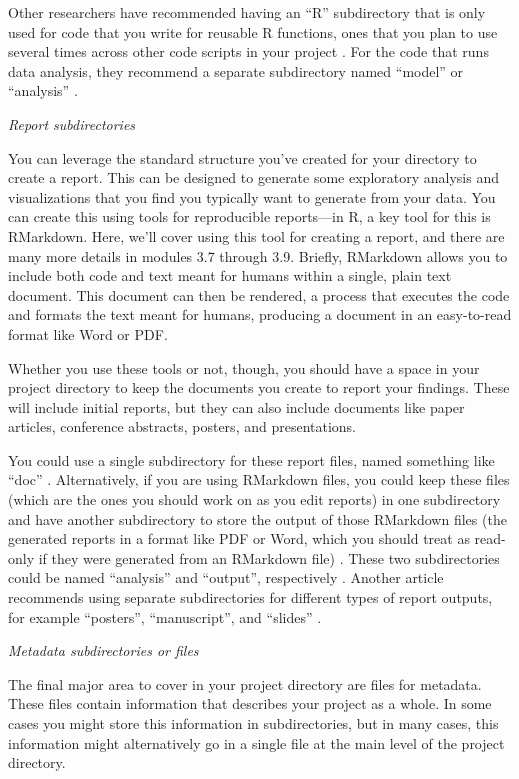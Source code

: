 \documentclass[]{tufte-book}
\begin{document}
Other researchers have recommended having an ``R'' subdirectory that is only used
for code that you write for reusable R functions, ones that you plan to use
several times across other code scripts in your project \citep{vuorre2021sharing, marwick2018packaging}. For the code that runs data analysis, they recommend a
separate subdirectory named ``model'' \citep{vuorre2021sharing} or ``analysis''
\citep{marwick2018packaging}.

\emph{Report subdirectories}

You can leverage the standard structure you've created for your directory to
create a report. This can be designed to generate some exploratory analysis and
visualizations that you find you typically want to generate from your data. You
can create this using tools for reproducible reports---in R, a key tool for this
is RMarkdown. Here, we'll cover using this tool for creating a report, and there
are many more details in modules 3.7 through 3.9. Briefly, RMarkdown allows you
to include both code and text meant for humans within a single, plain text
document. This document can then be rendered, a process that executes the code
and formats the text meant for humans, producing a document in an easy-to-read
format like Word or PDF.

Whether you use these tools or not, though, you should have a space in your
project directory to keep the documents you create to report your findings.
These will include initial reports, but they can also include documents like
paper articles, conference abstracts, posters, and presentations.

You could use a single subdirectory for these report files, named something like
``doc'' \citep{prodigenr, noble2009quick}. Alternatively, if you are using RMarkdown
files, you could keep these files (which are the ones you should work on as you
edit reports) in one subdirectory and have another subdirectory to store the
output of those RMarkdown files (the generated reports in a format like PDF or
Word, which you should treat as read-only if they were generated from an
RMarkdown file) \citep{blischak2019creating}. These two subdirectories could be named
``analysis'' and ``output'', respectively \citep{blischak2019creating}. Another article
recommends using separate subdirectories for different types of report outputs,
for example ``posters'', ``manuscript'', and ``slides'' \citep{vuorre2021sharing}.

\emph{Metadata subdirectories or files}

The final major area to cover in your project directory are files for metadata.
These files contain information that describes your project as a whole. In some
cases you might store this information in subdirectories, but in many cases,
this information might alternatively go in a single file at the main level of
the project directory.
\end{document}
